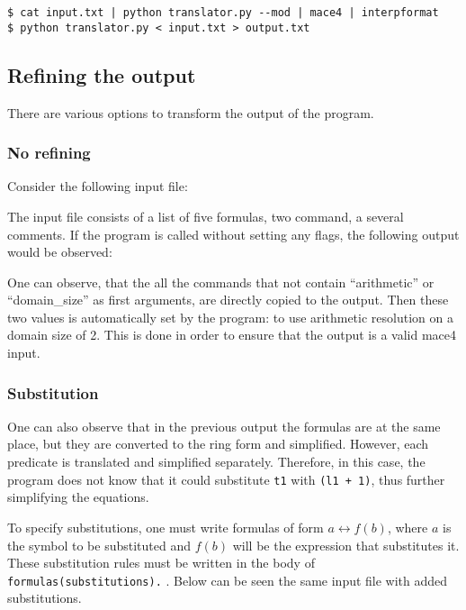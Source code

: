 \begin{lstlisting}[numbers=none, caption=The possible ways of using the output of the program]
$ cat input.txt | python translator.py --mod | mace4 | interpformat
$ python translator.py < input.txt > output.txt
\end{lstlisting}




\subsection{Refining the output}

There are various options to transform the output of the program.

\subsubsection{No refining}

Consider the following input file:


 
The input file consists of a list of five formulas, two command, a several comments. If the program is called without setting any flags, the following output would be observed:



One can observe, that the all the commands that not contain ``arithmetic'' or ``domain\_size'' as first arguments, are directly copied to the output. Then these two values is automatically set by the program: to use arithmetic resolution on a domain size of 2. This is done in order to ensure that the output is a valid mace4 input.



\subsubsection{Substitution}

One can also observe that in the previous output the formulas are at the same place, but they are converted to the ring form and simplified. However, each predicate is translated and simplified separately. Therefore, in this case, the program does not know that it could substitute \verb|t1| with \verb|(l1 + 1)|, thus further simplifying the equations.

To specify substitutions, one must write formulas of form $a \leftrightarrow f(b)$, where $a$ is the symbol to be substituted and $f(b)$ will be the expression that substitutes it. These substitution rules must be written in the body of \verb|formulas(substitutions).| . Below can be seen the same input file with added substitutions.

